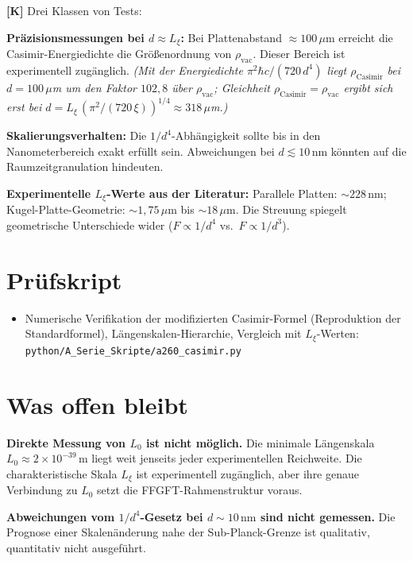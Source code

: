\textbf{[K]} Drei Klassen von Tests:

\textbf{Präzisionsmessungen bei $d\approx L_\xi$:} Bei Plattenabstand $\approx100\,\mu$m
erreicht die Casimir-Energiedichte die Größenordnung von $\rho_\text{vac}$. Dieser
Bereich ist experimentell zugänglich. \textit{(Mit der Energiedichte $\pi^2\hbar c/(720\,d^4)$ liegt $\rho_\text{Casimir}$ bei $d=100\,\mu$m um den Faktor $102{,}8$ über $\rho_\text{vac}$; Gleichheit $\rho_\text{Casimir}=\rho_\text{vac}$ ergibt sich erst bei $d = L_\xi\,(\pi^2/(720\,\xi))^{1/4} \approx 318\,\mu$m.)}

\textbf{Skalierungsverhalten:} Die $1/d^4$-Abhängigkeit sollte bis in den
Nanometerbereich exakt erfüllt sein. Abweichungen bei $d\lesssim10\,\text{nm}$ könnten
auf die Raumzeitgranulation hindeuten.

\textbf{Experimentelle $L_\xi$-Werte aus der Literatur:} Parallele Platten:
$\sim228\,\text{nm}$; Kugel-Platte-Geometrie: $\sim1{,}75\,\mu\text{m}$ bis
$\sim18\,\mu\text{m}$. Die Streuung spiegelt geometrische Unterschiede wider
($F\propto1/d^4$ vs.\ $F\propto1/d^3$).

\section{Prüfskript}

\begin{itemize}[leftmargin=2em,itemsep=2pt,topsep=2pt]
  \item Numerische Verifikation der modifizierten Casimir-Formel (Reproduktion
    der Standardformel), Längenskalen-Hierarchie, Vergleich mit $L_\xi$-Werten:
    \texttt{python/A\_Serie\_Skripte/a260\_casimir.py}
\end{itemize}

\section{Was offen bleibt}

\textbf{Direkte Messung von $L_0$ ist nicht möglich.} Die minimale Längenskala
$L_0\approx2\times10^{-39}\,\text{m}$ liegt weit jenseits jeder experimentellen
Reichweite. Die charakteristische Skala $L_\xi$ ist experimentell zugänglich,
aber ihre genaue Verbindung zu $L_0$ setzt die FFGFT-Rahmenstruktur voraus.

\textbf{Abweichungen vom $1/d^4$-Gesetz bei $d\sim10\,\text{nm}$ sind nicht
gemessen.} Die Prognose einer Skalenänderung nahe der Sub-Planck-Grenze ist
qualitativ, quantitativ nicht ausgeführt.

